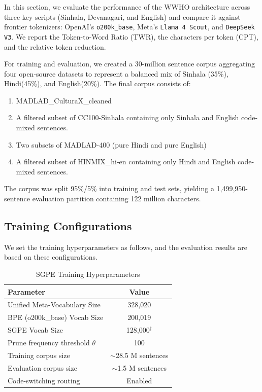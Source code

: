In this section, we evaluate the performance of the WWHO architecture across three key scripts (Sinhala, Devanagari, and English) and compare it against frontier tokenizers: OpenAI’s \texttt{o200k\_base}, Meta’s \texttt{Llama 4 Scout}, and \texttt{DeepSeek V3}. We report the Token-to-Word Ratio (TWR), the characters per token (CPT), and the relative token reduction.

For training and evaluation, we created a 30-million sentence corpus\cite{wwho30m} aggregating four open-source datasets to represent a balanced mix of Sinhala (35\%), Hindi(45\%), and English(20\%). The final corpus consists of: 
\begin{enumerate}
\item MADLAD\_CulturaX\_cleaned\cite{polyglots}
\item A filtered subset of CC100-Sinhala\cite{cc100sinhala} containing only Sinhala and English code-mixed sentences.
\item Two subsets of MADLAD-400 (pure Hindi and pure English)\cite{allen2023madlad400} 
\item A filtered subset of HINMIX\_hi-en\cite{hicm2024synthetic} containing only Hindi and English code-mixed sentences.
\end{enumerate}

The corpus was split 95\%/5\% into training and test sets, yielding a 1,499,950-sentence evaluation partition containing 122 million characters.

\subsection{Training Configurations}
We set the training hyperparameters as follows, and the evaluation results are based on these configurations.

\begin{table}[H]
\caption{SGPE Training Hyperparameters}
\label{tab:hyperparams}
\begin{center}
\begin{tabular}{lc}
\toprule
Parameter & Value \\
\midrule
Unified Meta-Vocabulary Size & 328,020 \\
BPE (o200k\_base) Vocab Size & 200,019 \\
SGPE Vocab Size & 128,000$^\dagger$ \\
Prune frequency threshold $\theta$ & 100 \\
Training corpus size & $\sim$28.5 M sentences \\
Evaluation corpus size & $\sim$1.5 M sentences \\
Code-switching routing & Enabled \\
\bottomrule
\end{tabular}
\end{center}
\end{table}

